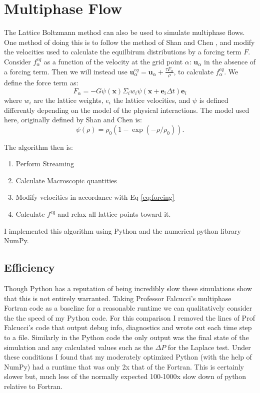 \documentclass[]{article}
\begin{document}
\section{Multiphase Flow}
The Lattice Boltzmann method can also be used to simulate multiphase flows. One method of doing this is to follow the method of Shan and Chen \cite{SC}, and modify the velocities used to calculate the equilbirum distributions by a forcing term $F$. Consider $f^{eq}_{\alpha}$ as a function of the velocity at the grid point $\alpha$: $\boldsymbol{u}_{\alpha}$ in the absence of a forcing term. Then we will instead use $\boldsymbol{u}^{eq}_{\alpha}= \boldsymbol{u}_{\alpha}+\frac{\tau F_{\alpha}}{\rho}$, to calculate $f^{eq}_{\alpha}$. We define the force term as:
\begin{equation}
	F_{\alpha} = -G \psi(\boldsymbol{x})\Sigma_i w_i\psi(\boldsymbol{x}+\boldsymbol{e}_i\Delta t)\boldsymbol{e}_i
	\label{eq:forcing}
\end{equation}
where $w_i$ are the lattice weights, $e_i$ the lattice velocities, and $\psi$ is defined differently depending on the model of the physical interactions. The model used here, originally defined by Shan and Chen is:
\begin{equation}
\psi(\rho) = \rho_0(1-\exp(-\rho/\rho_0)).
\end{equation}


The algorithm then is:
\begin{enumerate}
	\item Perform Streaming
	\item Calculate Macroscopic quantities
	\item Modify velocities in accordance with Eq \ref{eq:forcing}
	\item Calculate $f^{eq}$ and relax all lattice points toward it.
\end{enumerate}

I implemented this algorithm using Python and the numerical python library NumPy.

\subsection{Efficiency}
Though Python has a reputation of being incredibly slow these simulations show that this is not entirely warranted. Taking Professor Falcucci's multiphase Fortran code as a baseline for a reasonable runtime we can qualitatively consider the the speed of my Python code. For this comparison I removed the lines of Prof Falcucci's code that output debug info, diagnostics and wrote out each time step to a file. Similarly in the Python code the only output was the final state of the simulation and any calculated values such as the $\Delta P$ for the Laplace test. Under these conditions I found that my moderately optimized Python (with the help of NumPy) had a runtime that was only 2x that of the Fortran. This is certainly slower but, much less of the normally expected 100-1000x \cite{speed} slow down of python relative to Fortran.
\end{document}
